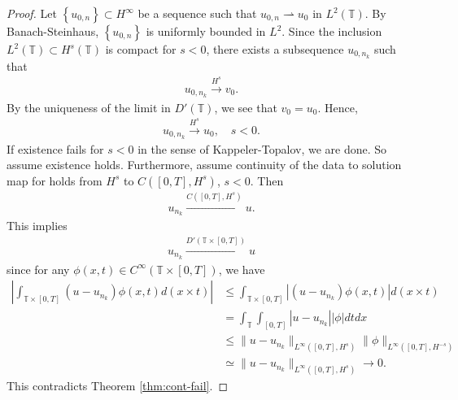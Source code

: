 \documentclass[12pt,reqno]{amsart}
\numberwithin{equation}{section}  %
\newcommand{\ci}{\mathbb{T}}
\begin{document}
    \begin{proof}
      Let 
      $\left\{ u_{0,n} \right\} \subset H^{\infty}$ be a sequence such that $u_{0,n}
      \rightharpoonup u_{0}$ in $L^{2}(\ci)$. By Banach-Steinhaus, $\left\{
      u_{0,n}
      \right\}$ is uniformly bounded in $L^{2}$.
      Since the
      inclusion $L^{2}(\ci) \subset H^{s}(\ci)$ is compact for $s<0$, there
      exists a subsequence $u_{0,n_{k}}$ such that
      \begin{equation*}
      \begin{split}
        u_{0,n_{k}} \xrightarrow{H^{s}} v_{0}.
      \end{split}
      \end{equation*}
      By the uniqueness of the limit in $D'(\ci)$, we see that $v_{0} = u_{0}$. 
      Hence,
      \begin{equation*}
      \begin{split}
        u_{0,n_{k}} \xrightarrow{H^{s}}u_{0}, \quad s<0.
      \end{split}
      \end{equation*}
      If existence fails for $s<0$ in the sense of
      Kappeler-Topalov, we are done. So assume
      existence holds. Furthermore, assume continuity of the data to solution map for
      holds from $H^{s}$ to $C([0, T], H^{s})$, $s < 0$. Then
      \begin{equation}
        \label{s-conv}
      \begin{split}
      u_{n_{k}} \xrightarrow{C\left( [0,T], H^{s} \right)} u.
      \end{split}
      \end{equation}
      This implies
      \begin{equation*}
      \begin{split}
        u_{n_{k}} \xrightarrow{D'(\ci \times [0, T])} u
      \end{split}
      \end{equation*}
      since for any $\phi(x,t) \in C^{\infty}\left( \ci \times [0,T] \right)$,
      we have
      \begin{equation*}
      \begin{split}
        | \int_{\ci \times [0,T]} (u - u_{n_{k}}) \phi(x,t) d (x \times t) |
        & \le  \int_{\ci \times [0,T]} | (u - u_{n_{k}}) \phi(x,t)| d (x \times t) 
        \\
        & = \int_{\ci} \int_{[0,T]} | u - u_{n_{k}} | | \phi | dt dx
        \\
        & \le \| u - u_{n_{k}} \|_{L^{\infty}\left( [0,T], H^{s} \right)} \|
        \phi \|_{L^{\infty}\left( [0,T], H^{-s} \right)}
        \\
        & \simeq \| u - u_{n_{k}} \|_{L^{\infty}\left( [0,T], H^{s} \right)} \to
        0.
      \end{split}
      \end{equation*}
     This contradicts Theorem \ref{thm:cont-fail}.
    \end{proof}
\end{document}
